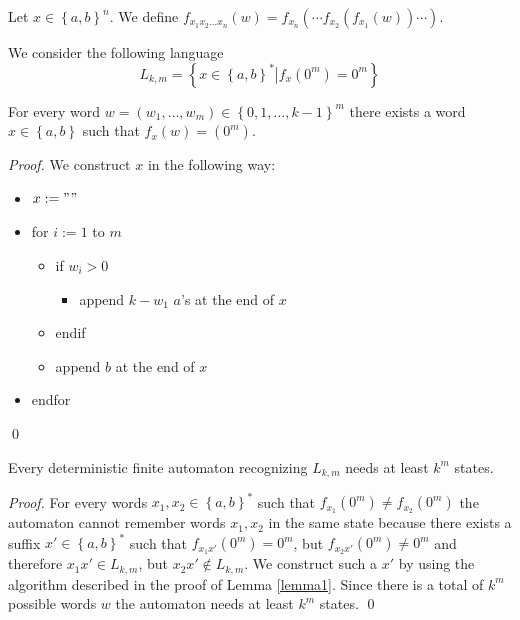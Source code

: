 \documentclass{llncs}
\begin{document}
Let $x \in \left\{ a, b \right\} ^n$. We define $f_{x_1 x_2 \ldots x_n} \left( w \right) = f_{x_n} \left( \cdots f_{x_2} \left( f_{x_1} \left( w \right) \right) \cdots \right)$.

We consider the following language
$$
L_{k,m} = \left\{ x \in \left\{ a, b \right\}^* \left| f_x(0^m) = 0^m \right.  \right\}
$$

\begin{lemma} \label{lemma1}
For every word $w = \left( w_1, \ldots, w_m \right) \in \left\{ 0, 1, \ldots, k-1 \right\} ^ m$ there exists a word $x \in \left\{ a, b \right\}$ such that $f_x \left( w \right) = \left( 0^m \right)$.
\end{lemma}
\begin{proof}
We construct $x$ in the following way:
\begin{itemize}[label={}]
	\item $x := ""$
	\item for $i := 1$ to $m$
	\begin{itemize}[label={}]
		\item if $w_i > 0$
		\begin{itemize}[label={}]
			\item append $k - w_1$ $a$'s at the end of $x$
		\end{itemize}
		\item endif
		\item append $b$ at the end of $x$
	\end{itemize}
\item endfor
\end{itemize}
\qed
\end{proof}

\begin{theorem}
Every deterministic finite automaton recognizing $L_{k,m}$ needs at least $k^m$ states.
\end{theorem}
\begin{proof}
For every words $x_1, x_2 \in \left\{ a,b \right\}^*$ such that $f_{x_1}(0^m) \not = f_{x_2}(0^m)$ the automaton cannot remember words $x_1, x_2$ in the same state because there exists a suffix $x' \in \left\{ a,b \right\}^*$ such that $f_{x_1 x'}(0^m) = 0^m$, but $f_{x_2 x'}(0^m) \not = 0^m$ and therefore $x_1 x' \in L_{k,m}$, but $x_2 x' \notin L_{k,m}$. We construct such a $x'$ by using the algorithm described in the proof of Lemma \ref{lemma1}. Since there is a total of $k^m$ possible words $w$ the automaton needs at least $k^m$ states.
\qed
\end{proof}
\end{document}
